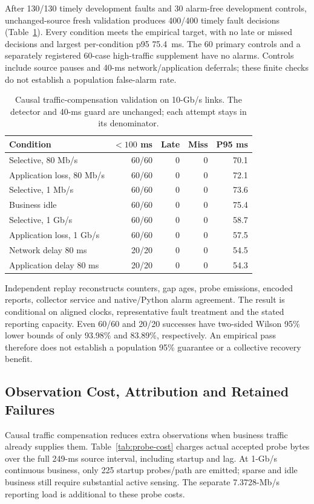 \documentclass[sigconf]{acmart}
\begin{document}
After 130/130 timely development faults and 30 alarm-free development
controls, unchanged-source fresh validation produces 400/400 timely fault
decisions (Table~\ref{tab:adaptive-business-validation}). Every condition
meets the empirical target, with no late or missed decisions and largest
per-condition p95 75.4~ms. The 60 primary controls and a separately registered
60-case high-traffic supplement have no alarms. Controls include source
pauses and 40-ms network/application deferrals; these finite checks do not
establish a population false-alarm rate.

\begin{table}[t]
\caption{Causal traffic-compensation validation on 10-Gb/s links.
The detector and 40-ms guard are unchanged; each attempt stays in its denominator.}
\label{tab:adaptive-business-validation}
\centering
\small
\setlength{\tabcolsep}{3pt}
\begin{tabular}{@{}lrrrr@{}}
\toprule
Condition & $<100$ ms & Late & Miss & P95 ms \\
\midrule
Selective, 80 Mb/s & 60/60 & 0 & 0 & 70.1 \\
Application loss, 80 Mb/s & 60/60 & 0 & 0 & 72.1 \\
Selective, 1 Mb/s & 60/60 & 0 & 0 & 73.6 \\
Business idle & 60/60 & 0 & 0 & 75.4 \\
Selective, 1 Gb/s & 60/60 & 0 & 0 & 58.7 \\
Application loss, 1 Gb/s & 60/60 & 0 & 0 & 57.5 \\
Network delay 80 ms & 20/20 & 0 & 0 & 54.5 \\
Application delay 80 ms & 20/20 & 0 & 0 & 54.3 \\
\bottomrule
\end{tabular}
\end{table}

Independent replay reconstructs counters, gap ages, probe emissions,
encoded reports, collector service and native/Python alarm agreement.
The result is conditional on aligned clocks, representative fault treatment
and the stated reporting capacity. Even 60/60 and 20/20 successes have
two-sided Wilson 95\% lower bounds of only 93.98\% and 83.89\%, respectively.
An empirical pass therefore does not establish a population 95\% guarantee
or a collective recovery benefit.

\subsection{Observation Cost, Attribution and Retained Failures}
\label{sec:attribution}
Causal traffic compensation reduces extra observations when business traffic
already supplies them. Table~\ref{tab:probe-cost} charges actual accepted
probe bytes over the full 249-ms source interval, including startup and lag.
At 1-Gb/s continuous business, only 225 startup probes/path are emitted;
sparse and idle business still require substantial active sensing. The
separate 7.3728-Mb/s reporting load is additional to these probe costs.
\end{document}
